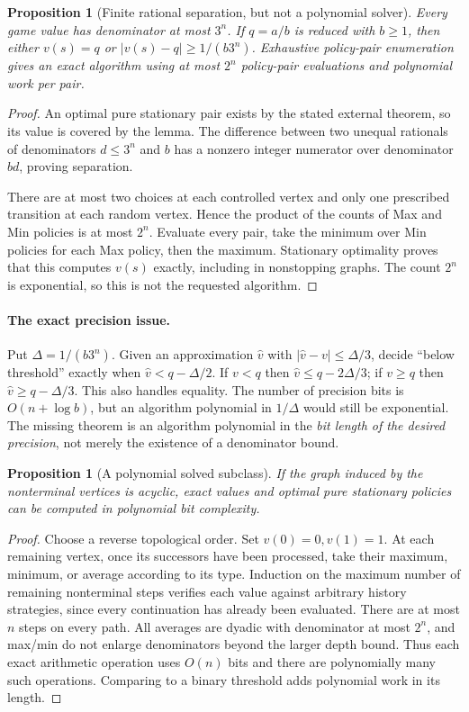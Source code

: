 \documentclass[11pt,a4paper]{article}
\newtheorem{proposition}[theorem]{Proposition}
\theoremstyle{definition}
\theoremstyle{remark}
\begin{document}
\begin{proposition}[Finite rational separation, but not a polynomial solver]
Every game value has denominator at most $3^n$. If $q=a/b$ is reduced with $b\geq1$, then either $v(s)=q$ or $|v(s)-q|\geq1/(b3^n)$. Exhaustive policy-pair enumeration gives an exact algorithm using at most $2^n$ policy-pair evaluations and polynomial work per pair.
\end{proposition}
\begin{proof}
An optimal pure stationary pair exists by the stated external theorem, so its value is covered by the lemma. The difference between two unequal rationals of denominators $d\leq3^n$ and $b$ has a nonzero integer numerator over denominator $bd$, proving separation.

There are at most two choices at each controlled vertex and only one prescribed transition at each random vertex. Hence the product of the counts of Max and Min policies is at most $2^n$. Evaluate every pair, take the minimum over Min policies for each Max policy, then the maximum. Stationary optimality proves that this computes $v(s)$ exactly, including in nonstopping graphs. The count $2^n$ is exponential, so this is not the requested algorithm.
\end{proof}

\paragraph{The exact precision issue.}
Put $\Delta=1/(b3^n)$. Given an approximation $\widehat v$ with $|\widehat v-v|\leq\Delta/3$, decide ``below threshold'' exactly when $\widehat v<q-\Delta/2$. If $v<q$ then $\widehat v\leq q-2\Delta/3$; if $v\geq q$ then $\widehat v\geq q-\Delta/3$. This also handles equality. The number of precision bits is $O(n+\log b)$, but an algorithm polynomial in $1/\Delta$ would still be exponential. The missing theorem is an algorithm polynomial in the \emph{bit length of the desired precision}, not merely the existence of a denominator bound.

\begin{proposition}[A polynomial solved subclass]
If the graph induced by the nonterminal vertices is acyclic, exact values and optimal pure stationary policies can be computed in polynomial bit complexity.
\end{proposition}
\begin{proof}
Choose a reverse topological order. Set $v(0)=0,v(1)=1$. At each remaining vertex, once its successors have been processed, take their maximum, minimum, or average according to its type. Induction on the maximum number of remaining nonterminal steps verifies each value against arbitrary history strategies, since every continuation has already been evaluated. There are at most $n$ steps on every path. All averages are dyadic with denominator at most $2^n$, and max/min do not enlarge denominators beyond the larger depth bound. Thus each exact arithmetic operation uses $O(n)$ bits and there are polynomially many such operations. Comparing to a binary threshold adds polynomial work in its length.
\end{proof}
\end{document}

